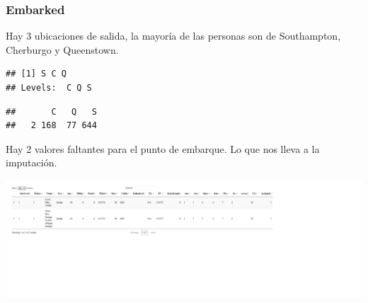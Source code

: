 \documentclass[]{article}
\newenvironment{Shaded}{\begin{snugshade}}{\end{snugshade}}
\newcommand{\KeywordTok}[1]{\textcolor[rgb]{0.13,0.29,0.53}{\textbf{#1}}}
\newcommand{\DecValTok}[1]{\textcolor[rgb]{0.00,0.00,0.81}{#1}}
\newcommand{\StringTok}[1]{\textcolor[rgb]{0.31,0.60,0.02}{#1}}
\newcommand{\OperatorTok}[1]{\textcolor[rgb]{0.81,0.36,0.00}{\textbf{#1}}}
\newcommand{\NormalTok}[1]{#1}
\begin{document}
\begin{Shaded}
\end{Shaded}

\subsubsection{Embarked}\label{embarked}

Hay 3 ubicaciones de salida, la mayoría de las personas son de
Southampton, Cherburgo y Queenstown.

\begin{Shaded}
\end{Shaded}

\begin{verbatim}
## [1] S C Q  
## Levels:  C Q S
\end{verbatim}

\begin{Shaded}
\end{Shaded}

\begin{verbatim}
##       C   Q   S 
##   2 168  77 644
\end{verbatim}

Hay 2 valores faltantes para el punto de embarque. Lo que nos lleva a la
imputación.

\includegraphics{titanicDataClean_files/figure-latex/miss-1.pdf}
\end{document}
